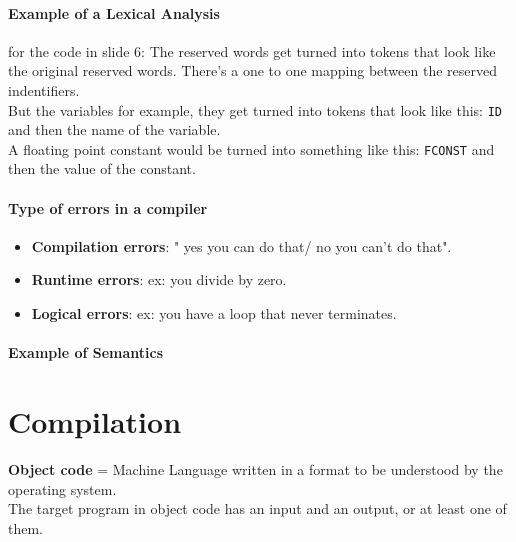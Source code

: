     \paragraph{Example of a Lexical Analysis}
    for the code in slide 6:
    The reserved words get turned into tokens that look like the original reserved words. There's a one to one mapping between the reserved indentifiers.\\
    But the variables for example, they get turned into tokens that look like this: \texttt{ID} and then the name of the variable.\\
    A floating point constant would be turned into something like this: \texttt{FCONST} and then the value of the constant.\\
    
    \paragraph{Type of errors in a compiler}
    \begin{itemize}
        \item \textbf{Compilation errors}: " yes you can do that/ no you can't do that".
        \item \textbf{Runtime errors}: ex: you divide by zero.
        \item \textbf{Logical errors}: ex: you have a loop that never terminates.
    \end{itemize}

    \paragraph{Example of Semantics}
    \begin{table}[H]
        \centering
    \end{table}

    \section{Compilation}
    \textbf{Object code }= Machine Language written in a format to be understood by the operating system.\\
    The target program in object code has an input and an output, or at least one of them.\\
    
